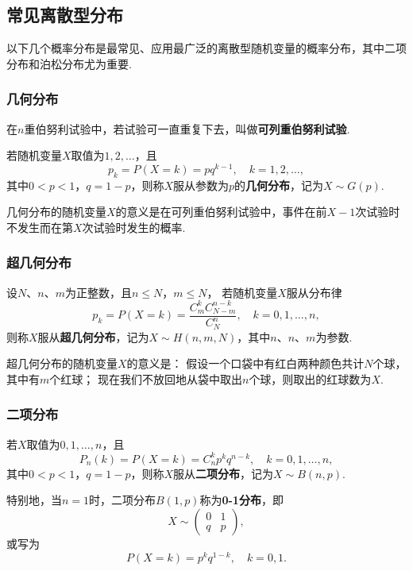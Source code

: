 \subsection{常见离散型分布}

以下几个概率分布是最常见、应用最广泛的离散型随机变量的概率分布，其中二项分布和泊松分布尤为重要.

\subsubsection{几何分布}
\begin{definition}
在\(n\)重伯努利试验中，若试验可一直重复下去，叫做\textbf{可列重伯努利试验}.
\end{definition}

\begin{definition}
若随机变量\(X\)取值为\(1,2,\dotsc\)，且\begin{equation}
p_k = P(X=k) = p q^{k-1}, \quad k=1,2,\dotsc,
\end{equation}其中\(0 < p < 1\)，\(q = 1-p\)，则称\(X\)服从参数为\(p\)的\textbf{几何分布}，记为\(X \sim G(p)\).
\end{definition}

几何分布的随机变量\(X\)的意义是在可列重伯努利试验中，事件在前\(X-1\)次试验时不发生而在第\(X\)次试验时发生的概率.

\subsubsection{超几何分布}
\begin{definition}
设\(N\)、\(n\)、\(m\)为正整数，且\(n \leqslant N\)，\(m \leqslant N\)，%
若随机变量\(X\)服从分布律\begin{equation}
p_k = P(X=k) = \frac{C_m^k C_{N-m}^{n-k}}{C_N^n}, \quad k=0,1,\dotsc,n,
\end{equation}则称\(X\)服从\textbf{超几何分布}，记为\(X \sim H(n,m,N)\)，其中\(n\)、\(n\)、\(m\)为参数.
\end{definition}

超几何分布的随机变量\(X\)的意义是：
假设一个口袋中有红白两种颜色共计\(N\)个球，其中有\(m\)个红球；
现在我们不放回地从袋中取出\(n\)个球，则取出的红球数为\(X\).

\subsubsection{二项分布}
\begin{definition}
若\(X\)取值为\(0,1,\dotsc,n\)，且\begin{equation}
P_n(k) = P(X=k) = C_n^k p^k q^{n-k}, \quad k=0,1,\dotsc,n,
\end{equation}其中\(0 < p < 1\)，\(q = 1-p\)，则称\(X\)服从\textbf{二项分布}，记为\(X \sim B(n,p)\).

特别地，当\(n = 1\)时，二项分布\(B(1,p)\)称为\textbf{0-1分布}，即\[
X \sim \begin{pmatrix} 0 & 1 \\ q & p \end{pmatrix},
\]或写为\[
P(X=k) = p^k q^{1-k}, \quad k=0,1.
\]
\end{definition}


